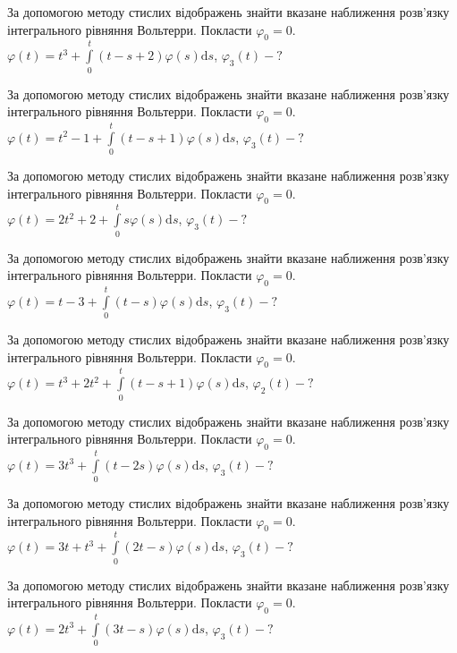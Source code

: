 \documentclass[12pt]{extarticle}
\begin{document}
\begin{Exercise}
За допомогою методу стислих відображень знайти вказане наближення розв’язку інтегрального рівняння Вольтерри. Покласти $\varphi_0=0$. $\varphi(t) = t^3 + \int\limits_{0}^{t} (t-s+2) \varphi(s) \mathrm{d}s$, $\varphi_3(t) - ?$
\end{Exercise}

\begin{Exercise}
За допомогою методу стислих відображень знайти вказане наближення розв’язку інтегрального рівняння Вольтерри. Покласти $\varphi_0=0$. $\varphi(t) = t^2 - 1 + \int\limits_{0}^{t} (t-s+1) \varphi(s) \mathrm{d}s$, $\varphi_3(t) - ?$
\end{Exercise}

\begin{Exercise}
За допомогою методу стислих відображень знайти вказане наближення розв’язку інтегрального рівняння Вольтерри. Покласти $\varphi_0=0$. $\varphi(t) = 2 t^2 + 2 + \int\limits_{0}^{t} s \varphi(s) \mathrm{d}s$, $\varphi_3(t) - ?$
\end{Exercise}

\begin{Exercise}
За допомогою методу стислих відображень знайти вказане наближення розв’язку інтегрального рівняння Вольтерри. Покласти $\varphi_0=0$. $\varphi(t) = t - 3 + \int\limits_{0}^{t} (t-s) \varphi(s) \mathrm{d}s$, $\varphi_3(t) - ?$
\end{Exercise}

\begin{Exercise}
За допомогою методу стислих відображень знайти вказане наближення розв’язку інтегрального рівняння Вольтерри. Покласти $\varphi_0=0$. $\varphi(t) = t^3 +2 t^2 + \int\limits_{0}^{t} (t-s+1) \varphi(s) \mathrm{d}s$, $\varphi_2(t) - ?$
\end{Exercise}

\begin{Exercise}
За допомогою методу стислих відображень знайти вказане наближення розв’язку інтегрального рівняння Вольтерри. Покласти $\varphi_0=0$. $\varphi(t) = 3 t^3 + \int\limits_{0}^{t} (t-2s) \varphi(s) \mathrm{d}s$, $\varphi_3(t) - ?$
\end{Exercise}

\begin{Exercise}
За допомогою методу стислих відображень знайти вказане наближення розв’язку інтегрального рівняння Вольтерри. Покласти $\varphi_0=0$. $\varphi(t) = 3t + t^3 + \int\limits_{0}^{t} (2t-s) \varphi(s) \mathrm{d}s$, $\varphi_3(t) - ?$
\end{Exercise}

\begin{Exercise}
За допомогою методу стислих відображень знайти вказане наближення розв’язку інтегрального рівняння Вольтерри. Покласти $\varphi_0=0$. $\varphi(t) = 2t^3 + \int\limits_{0}^{t} (3 t-s) \varphi(s) \mathrm{d}s$, $\varphi_3(t) - ?$
\end{Exercise}
\end{document}
